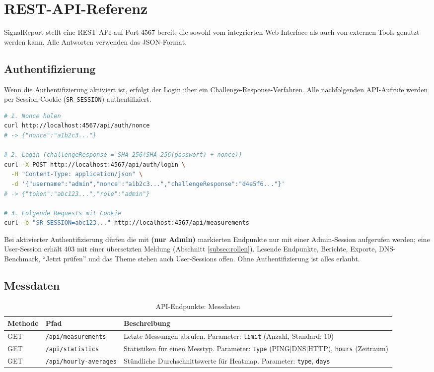 \section{REST-API-Referenz}
\label{sec:api}

SignalReport stellt eine REST-API auf Port 4567 bereit, die sowohl vom integrierten
Web-Interface als auch von externen Tools genutzt werden kann. Alle Antworten verwenden
das JSON-Format.

\subsection{Authentifizierung}

Wenn die Authentifizierung aktiviert ist, erfolgt der Login über ein
Challenge-Response-Verfahren. Alle nachfolgenden API-Aufrufe werden per
Session-Cookie (\texttt{SR\_SESSION}) authentifiziert.

\begin{lstlisting}[language=bash, caption={Beispiel: Login via Challenge-Response}]
# 1. Nonce holen
curl http://localhost:4567/api/auth/nonce
# -> {"nonce":"a1b2c3..."}

# 2. Login (challengeResponse = SHA-256(SHA-256(passwort) + nonce))
curl -X POST http://localhost:4567/api/auth/login \
  -H "Content-Type: application/json" \
  -d '{"username":"admin","nonce":"a1b2c3...","challengeResponse":"d4e5f6..."}'
# -> {"token":"abc123...","role":"admin"}

# 3. Folgende Requests mit Cookie
curl -b "SR_SESSION=abc123..." http://localhost:4567/api/measurements
\end{lstlisting}

Bei aktivierter Authentifizierung dürfen die mit \textbf{(nur Admin)} markierten Endpunkte
nur mit einer Admin-Session aufgerufen werden; eine User-Session erhält 403 mit einer
übersetzten Meldung (Abschnitt \ref{subsec:rollen}). Lesende Endpunkte, Berichte, Exporte,
DNS-Benchmark, \enquote{Jetzt prüfen} und das Theme stehen auch User-Sessions offen. Ohne
Authentifizierung ist alles erlaubt.

\subsection{Messdaten}

\begin{table}[h]
\centering
\small
\begin{tabular}{|l|l|p{7cm}|}
\hline
\textbf{Methode} & \textbf{Pfad} & \textbf{Beschreibung} \\
\hline
GET & \texttt{/api/measurements} & Letzte Messungen abrufen.
  Parameter: \texttt{limit} (Anzahl, Standard: 10) \\
\hline
GET & \texttt{/api/statistics} & Statistiken für einen Messtyp.
  Parameter: \texttt{type} (PING|DNS|HTTP), \texttt{hours} (Zeitraum) \\
\hline
GET & \texttt{/api/hourly-averages} & Stündliche Durchschnittswerte für Heatmap.
  Parameter: \texttt{type}, \texttt{days} \\
\hline
\end{tabular}
\caption{API-Endpunkte: Messdaten}
\end{table}

